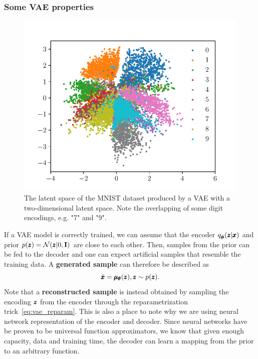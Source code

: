 \subsubsection{Some VAE properties}
\begin{figure}
\begin{centering}
\includegraphics[scale=0.8]{data/chapter_survey/mnist_latent}
\par\end{centering}
\caption{The latent space of the MNIST dataset produced by a VAE with a two-dimensional latent space. Note the overlapping of some digit encodings, e.g. "7" and "9".}
\label{fig:mnist_latent}
\end{figure}

If a VAE model is correctly trained, we can assume that the encoder $q_{\pmb{{\phi}}}(\pmb{{z}}|\pmb{{x}})$ and prior $p(\pmb{{z}})=\mathcal{N}(\pmb{{z}}|0,\textbf{I})$ are close to each other. Then, samples from the prior can be fed to the decoder and one can expect artificial samples that resemble the training data. A \textbf{generated sample} can therefore be described as
\begin{equation} \label{eq:generated_sample}
    \tilde{\pmb{{x}}} = \pmb{{\mu}}_{\pmb{{\theta}}}(\pmb{{z}}), \pmb{{z}} \sim p(\pmb{{z}}).
\end{equation}
Note that a \textbf{reconstructed sample} is instead obtained by sampling the encoding $\pmb{{z}}$ from the encoder through the reparametrization trick~\eqref{eq:vae_reparam}. This is also a place to note why we are using neural network representation of the encoder and decoder. Since neural networks have be proven to be universal function approximators, we know that given enough capacity, data and training time, the decoder can learn a mapping from the prior to an arbitrary function.

